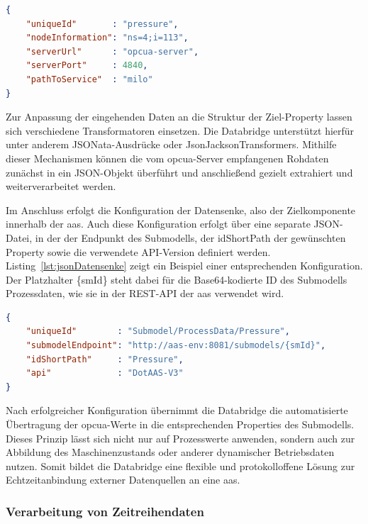 \begin{lstlisting}[language=json, caption={Beispielhafte JSON-Konfiguration einer Datenquelle}, label={lst:jsonDatenquelle}]
{
    "uniqueId"       : "pressure",
    "nodeInformation": "ns=4;i=113",
    "serverUrl"      : "opcua-server",
    "serverPort"     : 4840,
    "pathToService"  : "milo"
}
\end{lstlisting}

Zur Anpassung der eingehenden Daten an die Struktur der Ziel-Property lassen sich verschiedene Transformatoren einsetzen.
Die Databridge unterstützt hierfür unter anderem JSONata-Ausdrücke oder JsonJacksonTransformers.
Mithilfe dieser Mechanismen können die vom \acs{opcua}-Server empfangenen Rohdaten zunächst in ein JSON-Objekt überführt und anschließend gezielt extrahiert und weiterverarbeitet werden.

Im Anschluss erfolgt die Konfiguration der Datensenke, also der Zielkomponente innerhalb der \acs{aas}.
Auch diese Konfiguration erfolgt über eine separate JSON-Datei, in der der Endpunkt des Submodells, der idShortPath der gewünschten Property sowie die verwendete API-Version definiert werden.
Listing~\ref{lst:jsonDatensenke} zeigt ein Beispiel einer entsprechenden Konfiguration.
Der Platzhalter \{smId\} steht dabei für die Base64-kodierte ID des Submodells Prozessdaten, wie sie in der REST-API der \acs{aas} verwendet wird.
\begin{lstlisting}[language=json, caption={Beispielhafte JSON-Konfiguration einer Datensenke}, label={lst:jsonDatensenke}]
{
    "uniqueId"        : "Submodel/ProcessData/Pressure",
    "submodelEndpoint": "http://aas-env:8081/submodels/{smId}",
    "idShortPath"     : "Pressure",
    "api"             : "DotAAS-V3"
}
\end{lstlisting}

Nach erfolgreicher Konfiguration übernimmt die Databridge die automatisierte Übertragung der \acs{opcua}-Werte in die entsprechenden Properties des Submodells.
Dieses Prinzip lässt sich nicht nur auf Prozesswerte anwenden, sondern auch zur Abbildung des Maschinenzustands oder anderer dynamischer Betriebsdaten nutzen.
Somit bildet die Databridge eine flexible und protokolloffene Lösung zur Echtzeitanbindung externer Datenquellen an eine \acs{aas}.


\subsubsection{Verarbeitung von Zeitreihendaten}

